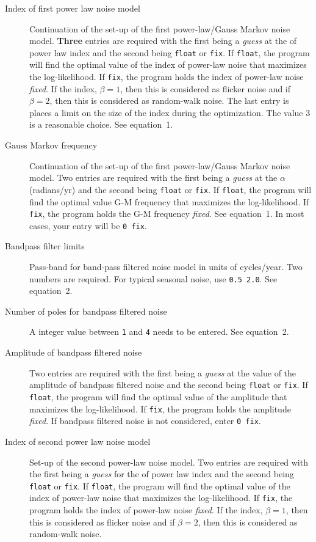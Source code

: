 \documentclass[12pt]{amsart}
\begin{document}
\begin{description}
\item[Index of first power law noise model] Continuation of the set-up of the first power-law/Gauss Markov noise model.
\textbf{Three} entries are required
with the first being a \textit{guess} at the of power law index and the second being \texttt{float} or \texttt{fix}.
If \texttt{float}, the program will find the optimal value of the index of power-law noise that maximizes the log-likelihood. If \texttt{fix},
the program holds the index of power-law noise \textit{fixed}.  If the index, $\beta=1$, then this is considered
as flicker noise and if $\beta=2$, then this is considered
as random-walk noise.  The last entry is places a limit on the size of the index during the optimization. The value
$3$ is a reasonable choice. See equation~1.

\item[Gauss Markov frequency] Continuation of the set-up of the first power-law/Gauss Markov noise model.
Two entries are required
with the first being a \textit{guess} at the ${\alpha}$ (radians/yr) and the second being \texttt{float} or \texttt{fix}.
If \texttt{float}, the program will find the optimal value G-M frequency that maximizes the log-likelihood. If \texttt{fix},
the program holds the G-M frequency \textit{fixed}.   See equation~1. In most cases, your entry will be \texttt{0 fix}.

\item[Bandpass filter limits] Pass-band for band-pass filtered noise model in units of cycles/year. Two numbers are
required. For typical seasonal noise, use \texttt{0.5 2.0}.  See equation~2.

\item[Number of poles for bandpass filtered noise] A integer value between \texttt{1} and \texttt{4} needs to be entered. See equation~2.

\item[Amplitude of bandpass filtered noise] Two entries are required
with the first being a \textit{guess} at the value of the amplitude of bandpass filtered noise and the second being \texttt{float} or \texttt{fix}.
If \texttt{float}, the program will find the optimal value of the amplitude  that maximizes the log-likelihood. If \texttt{fix},
the program holds the amplitude  \textit{fixed}.  If bandpass filtered noise is not considered, enter \texttt{0 fix}.

\item[Index of second power law noise model] Set-up of the second power-law noise model.
Two entries are required
with the first being a \textit{guess} for the of power law index and the second being \texttt{float} or \texttt{fix}.
If \texttt{float}, the program will find the optimal value of the index of power-law noise that maximizes the log-likelihood. If \texttt{fix},
the program holds the index of power-law noise \textit{fixed}.  If the index, $\beta=1$, then this is considered
as flicker noise and if $\beta=2$, then this is considered
as random-walk noise.


\end{description}
\end{document}
